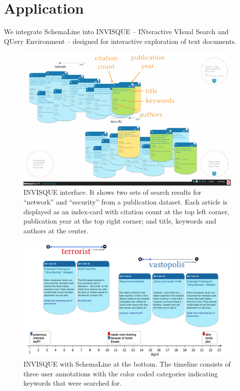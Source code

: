 \section{Application}
We integrate SchemaLine into INVISQUE -- INteractive VIsual Search and QUery Environment -- designed for interactive exploration of text documents. 

\begin{figure}[!htb]
	\centering
	\includegraphics[width=\linewidth]{invisque}
	\caption{INVISQUE interface. It shows two sets of search results for ``network'' and ``security'' from a publication dataset. Each article is displayed as an index-card with citation count at the top left corner, publication year at the top right corner; and title, keywords and authors at the center.}
	\label{fig:invisque}
\end{figure}

\begin{figure}[!htb]
	\centering
	\includegraphics[width=\linewidth]{invisque-schemaline}
	\caption{INVISQUE with SchemaLine at the bottom. The timeline consists of three user annotations with the color coded categories indicating keywords that were searched for.}
	\label{fig:invisque-schemaline}
\end{figure}

